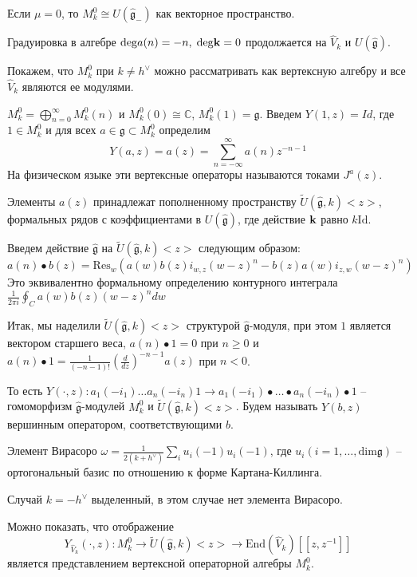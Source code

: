\documentclass[12pt]{article}
\newcommand{\gf}{\mathfrak{g}}
\newcommand{\gfh}{\hat{\mathfrak{g}}}
\begin{document}
Если $\mu=0$, то $M^0_k\cong U(\gfh_-)$ как векторное пространство. 

Градуировка в алгебре $\mathrm{deg} a(n)=-n, \; \mathrm{deg} {\bf k}=0$ 
продолжается на $\hat{V}_k$ и $U(\gfh)$.

Покажем, что $M^0_k$ при $k\neq h^{\vee}$ можно рассматривать как вертексную
алгебру и все $\hat{V}_k$ являются ее модулями. 

$M^0_k=\bigoplus_{n=0}^{\infty} M^0_k(n)$ и $M^0_k(0)\cong \mathbb{C}$,
$M^0_k(1)=\gf$. Введем $Y(1,z)=Id$, где $1\in M^0_k$ и для всех $a\in \gf\subset
M^0_k$ определим
\begin{equation}
  \label{eq:2}
  Y(a,z)=a(z)=\sum_{n=-\infty}^{\infty} a(n) z^{-n-1}
\end{equation}
На физическом языке эти вертексные операторы называются токами $J^a(z)$.

Элементы $a(z)$ принадлежат пополненному пространству $\tilde{U}(\gfh,k)<z>$, формальных
рядов с коэффициентами в $U(\gfh)$, где действие ${\bf k}$ равно $k
\mathrm{Id}$.

Введем действие $\gfh$ на $\tilde{U}(\gfh,k)<z>$ следующим образом:
\begin{equation}
  \label{eq:3}
  a(n)\bullet b(z)=\mathrm{Res}_w \left(a(w)b(z)i_{w,z}(w-z)^n - b(z)a(w) i_{z,w}(w-z)^n\right)
\end{equation}
Это эквивалентно формальному определению контурного интеграла $\frac{1}{2\pi i }
\oint_C a(w) b(z) (w-z)^n dw$

Итак, мы наделили  $\tilde{U}(\gfh,k)<z>$ структурой $\gfh$-модуля, при этом
$1$ является вектором старшего веса, $a(n)\bullet 1=0$ при $n\geq 0$ и
$a(n)\bullet 1=\frac{1}{(-n-1)!}\left(\frac{d}{dz}\right)^{-n-1}a(z)$ при $n<0$. 

То есть $Y(\cdot, z): a_1 (-i_1)\dots a_n(-i_n)1\to a_1(-i_1)\bullet\dots\bullet
a_n(-i_n)\bullet 1$ -- гомоморфизм $\gfh$-модулей $M^0_k$ и
$\tilde{U}(\gfh,k)<z>$. Будем называть $Y(b,z)$ вершинным оператором,
соответствующими $b$.

Элемент Вирасоро $\omega=\frac{1}{2(k+h^{\vee})}\sum_i u_i(-1) u_i(-1)$, где
$u_i (i=1,\dots,\mathrm{dim}\gf)$ -- ортогональный базис по отношению к форме
Картана-Киллинга. 

Случай $k=-h^{\vee}$ выделенный, в этом случае нет элемента Вирасоро.

Можно показать, что отображение
 $$Y_{\hat{V}_k}(\cdot,z):M^0_k\to
\tilde{U}(\gfh,k)<z> \to \mathrm{End}(\hat{V}_k)[[z,z^{-1}]]$$
является представлением вертексной операторной алгебры $M^0_k$.
\end{document}
